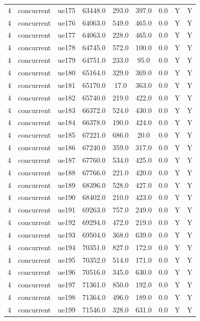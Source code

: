 \begin{table}[ht]
\begin{tabular}{|c|c|c|c|c|c|c|c|c|}
4 & concurrent & ue175 & 63448.0 & 293.0 & 397.0 & 0.0 & Y & Y \\
4 & concurrent & ue176 & 64063.0 & 549.0 & 465.0 & 0.0 & Y & Y \\
4 & concurrent & ue177 & 64063.0 & 228.0 & 465.0 & 0.0 & Y & Y \\
4 & concurrent & ue178 & 64745.0 & 572.0 & 100.0 & 0.0 & Y & Y \\
4 & concurrent & ue179 & 64751.0 & 233.0 & 95.0 & 0.0 & Y & Y \\
4 & concurrent & ue180 & 65164.0 & 329.0 & 369.0 & 0.0 & Y & Y \\
4 & concurrent & ue181 & 65170.0 & 17.0 & 363.0 & 0.0 & Y & Y \\
4 & concurrent & ue182 & 65740.0 & 219.0 & 422.0 & 0.0 & Y & Y \\
4 & concurrent & ue183 & 66372.0 & 524.0 & 430.0 & 0.0 & Y & Y \\
4 & concurrent & ue184 & 66378.0 & 190.0 & 424.0 & 0.0 & Y & Y \\
4 & concurrent & ue185 & 67221.0 & 686.0 & 20.0 & 0.0 & Y & Y \\
4 & concurrent & ue186 & 67240.0 & 359.0 & 317.0 & 0.0 & Y & Y \\
4 & concurrent & ue187 & 67760.0 & 534.0 & 425.0 & 0.0 & Y & Y \\
4 & concurrent & ue188 & 67766.0 & 221.0 & 420.0 & 0.0 & Y & Y \\
4 & concurrent & ue189 & 68396.0 & 528.0 & 427.0 & 0.0 & Y & Y \\
4 & concurrent & ue190 & 68402.0 & 210.0 & 423.0 & 0.0 & Y & Y \\
4 & concurrent & ue191 & 69263.0 & 757.0 & 249.0 & 0.0 & Y & Y \\
4 & concurrent & ue192 & 69294.0 & 472.0 & 219.0 & 0.0 & Y & Y \\
4 & concurrent & ue193 & 69504.0 & 368.0 & 639.0 & 0.0 & Y & Y \\
4 & concurrent & ue194 & 70351.0 & 827.0 & 172.0 & 0.0 & Y & Y \\
4 & concurrent & ue195 & 70352.0 & 514.0 & 171.0 & 0.0 & Y & Y \\
4 & concurrent & ue196 & 70516.0 & 345.0 & 630.0 & 0.0 & Y & Y \\
4 & concurrent & ue197 & 71361.0 & 850.0 & 192.0 & 0.0 & Y & Y \\
4 & concurrent & ue198 & 71364.0 & 496.0 & 189.0 & 0.0 & Y & Y \\
4 & concurrent & ue199 & 71546.0 & 328.0 & 631.0 & 0.0 & Y & Y \\

\end{tabular}
\end{table}
